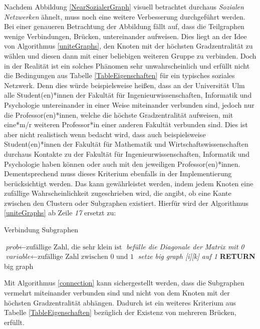 \newpage
Nachdem Abbildung \ref{NearSozialerGraph} visuell betrachtet durchaus \textit{Sozialen Netzwerken} ähnelt, muss noch eine weitere Verbesserung durchgeführt werden. Bei einer genaueren Betrachtung der Abbildung fällt auf, dass die Teilgraphen wenige Verbindungen, Brücken, untereinander aufweisen. Dies liegt an der Idee von Algorithmus \ref{uniteGraphs}, den Knoten mit der höchsten Gradzentralität zu wählen und diesen dann mit einer beliebigen weiteren Gruppe zu verbinden. Doch in der Realität ist ein solches Phänomen sehr unwahrscheinlich und erfüllt nicht die Bedingungen aus Tabelle \ref{TableEigenschaften} für ein typisches soziales Netzwerk. Denn dies würde beispielsweise heißen, dass an der Universität Ulm alle Student(en)*innen der Fakultät für Ingenieurwissenschaften, Informatik und Psychologie untereinander in einer Weise miteinander verbunden sind, jedoch nur die Professor(en)*innen, welche die höchste Gradzentralität aufweisen, mit eine*m/r weiteren Professor*in einer anderen Fakultät verbunden sind. Dies ist aber nicht realistisch wenn bedacht wird, dass auch beispielsweise Student(en)*innen der Fakultät für Mathematik und Wirtschaftswissenschaften durchaus Kontakte zu der Fakultät für Ingenieurwissenschaften, Informatik und Psychologie haben können oder auch mit den jeweiligen Professor(en)*innen. Dementsprechend muss dieses Kriterium ebenfalls in der Implementierung berücksichtigt werden. Das kann gewährleistet werden, indem jedem Knoten eine zufällige Wahrscheinlichkeit zugeschrieben wird, die angibt, ob eine Kante zwischen den Clustern oder Subgraphen existiert. Hierfür wird der Algorithmus \ref{uniteGraphs} ab Zeile \textit{17} ersetzt zu:

\begin{algorithm}
\caption{Verbindung Subgraphen}\label{connection}
\begin{algorithmic}[1]
\State $\textit{prob} \gets \text{zufällige Zahl, die sehr klein ist}$
\State \textit{befülle die Diagonale der Matrix mit 0}
\EndFor
{}
\State $\textit{variable} \gets \text{zufällige Zahl zwischen 0 und 1}$
\State \textit{setze big graph [i][k] auf 1}
\EndIf
\EndFor
\EndFor
\textbf{RETURN} big graph
\EndProcedure
\end{algorithmic}
\end{algorithm}

Mit Algorithmus \ref{connection} kann sichergestellt werden, dass die Subgraphen vermehrt miteinander verbunden sind und nicht von dem Knoten mit der höchsten Gradzentralität abhängen. Dadurch ist ein weiteres Kriterium aus Tabelle \ref{TableEigenschaften} bezüglich der Existenz von mehreren Brücken, erfüllt.

